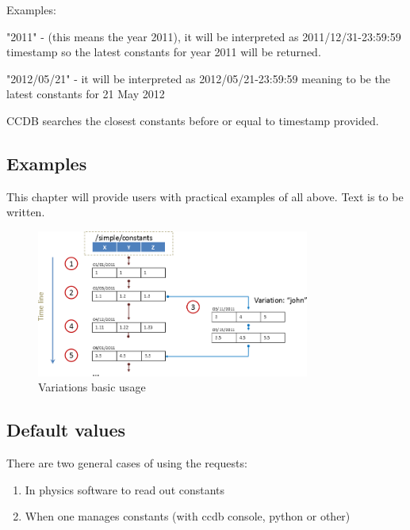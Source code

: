 \documentclass{article}
\begin{document}
Examples:

"2011" - (this means the year 2011), it will be interpreted as 
2011/12/31-23:59:59 timestamp so the latest constants for year 
2011 will be returned.


"2012/05/21" - it will be interpreted as 2012/05/21-23:59:59 meaning to be the 
latest constants for 21 May 2012

CCDB searches the closest constants before or equal to timestamp provided.


\subsection{Examples}

This chapter will provide users with practical examples of all above. 
Text is to be written.  

\begin{figure}[h]
  \centering
  \includegraphics[width=0.8\textwidth]{pics/variations_example1}
  \caption{Variations basic usage}
\end{figure}




\subsection{Default values}

There are two general cases of using the requests:
\begin{enumerate}
  \item In physics software to read out constants
  \item When one manages constants (with ccdb console, python or other)
\end{enumerate}
\vspace{1 em}
\end{document}
